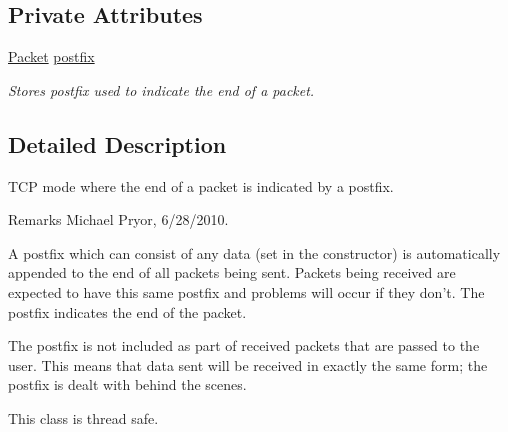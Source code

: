 \subsection*{Private Attributes}
\begin{DoxyCompactItemize}
\item 
\hypertarget{class_net_mode_tcp_postfix_a5a8fa5f721dfb18a246658c8e153516e}{
\hyperlink{class_packet}{Packet} \hyperlink{class_net_mode_tcp_postfix_a5a8fa5f721dfb18a246658c8e153516e}{postfix}}
\label{class_net_mode_tcp_postfix_a5a8fa5f721dfb18a246658c8e153516e}

\begin{DoxyCompactList}\small\item\em Stores postfix used to indicate the end of a packet. \item\end{DoxyCompactList}\end{DoxyCompactItemize}


\subsection{Detailed Description}
TCP mode where the end of a packet is indicated by a postfix. \begin{DoxyRemark}{Remarks}
Michael Pryor, 6/28/2010.
\end{DoxyRemark}
A postfix which can consist of any data (set in the constructor) is automatically appended to the end of all packets being sent. Packets being received are expected to have this same postfix and problems will occur if they don't. The postfix indicates the end of the packet.\par
\par


The postfix is not included as part of received packets that are passed to the user. This means that data sent will be received in exactly the same form; the postfix is dealt with behind the scenes.\par
\par


This class is thread safe. 

